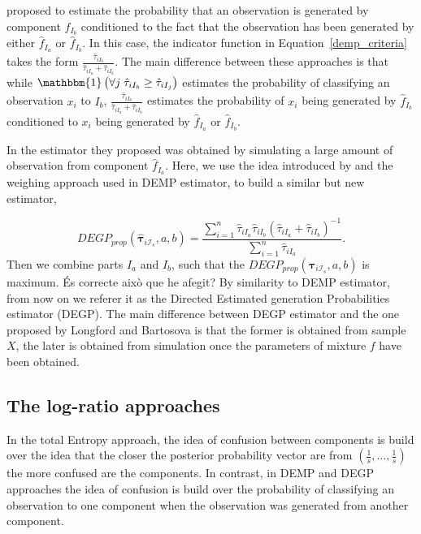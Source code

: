 \documentclass[10pt, a4paper]{article}
\newcommand{\m}[1]{\boldsymbol{#1}}
\begin{document}
\cite{longford2014} proposed to estimate the probability that an observation is generated by component $\hat{f}_{I_b}$ conditioned to the fact that the observation has been generated by either $\hat{f}_{I_a}$ or $\hat{f}_{I_b}$. In this case, the indicator function in Equation~\ref{demp_criteria} takes the form $\frac{\hat{\tau}_{iI_b}}{\hat{\tau}_{iI_a} + \hat{\tau}_{iI_b}}$. The main difference between these approaches is that while $\mathbbm{1}\left( \forall j\; \hat{\tau}_{i I_{b}} \geq \hat{\tau}_{iI_j} \right)$ estimates the probability of classifying an observation $x_i$ to $I_b$, $\frac{\hat{\tau}_{iI_b}}{\hat{\tau}_{iI_a} + \hat{\tau}_{iI_b}}$ estimates the probability of $x_i$ being generated by $\hat{f}_{I_b}$ conditioned to $x_i$  being generated by $\hat{f}_{I_a}$ or $\hat{f}_{I_b}$.

In \cite{longford2014} the estimator they proposed was obtained by simulating a large amount of observation from component $\hat{f}_{I_a}$. Here, we use the idea introduced by \cite{longford2014} and the weighing approach used in DEMP estimator, to build a similar but new estimator,

\begin{equation}\label{demp2_criteria}
DEGP_{prop}(\hat{\m \tau}_{i \mathcal{I}_s}, a, b) =\frac{ \sum_{i=1}^n \hat{\tau}_{iI_a} \hat{\tau}_{iI_b}(\hat{\tau}_{iI_a} + \hat{\tau}_{iI_b})^{-1}  }{\sum_{i=1}^n \hat{\tau}_{iI_a} }.
\end{equation}
Then we combine parts $I_a$ and $I_b$, such that the $DEGP_{prop}(\hat{\m \tau}_{i \mathcal{I}_s}, a, b)$ is maximum. {\color{blue} \'{E}s correcte aix\`{o} que he afegit?} By similarity to DEMP estimator, from now on we referer it as the Directed Estimated generation Probabilities estimator (DEGP). The main difference between DEGP estimator and the one proposed by Longford and Bartosova is that the former is obtained from sample $X$, the later is obtained from simulation once the parameters of mixture $f$ have been obtained.


\subsection{The log-ratio approaches}
\label{lr_approach}

In the total Entropy approach, the idea of confusion between components is build over the idea that the closer the posterior probability vector are from $(\frac{1}{s}, \dots, \frac{1}{s})$ the more confused are the components. In contrast, in DEMP and DEGP approaches the idea of confusion is build over the probability of classifying an observation to one component when the observation was generated from another component.
\end{document}
